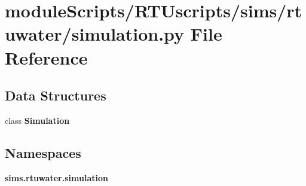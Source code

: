 \section{module\+Scripts/\+R\+T\+Uscripts/sims/rtuwater/simulation.py File Reference}
\label{rtuwater_2simulation_8py}
\subsection*{Data Structures}
\begin{DoxyCompactItemize}
\item 
class {\bf Simulation}
\end{DoxyCompactItemize}
\subsection*{Namespaces}
\begin{DoxyCompactItemize}
\item 
 {\bf sims.\+rtuwater.\+simulation}
\end{DoxyCompactItemize}
